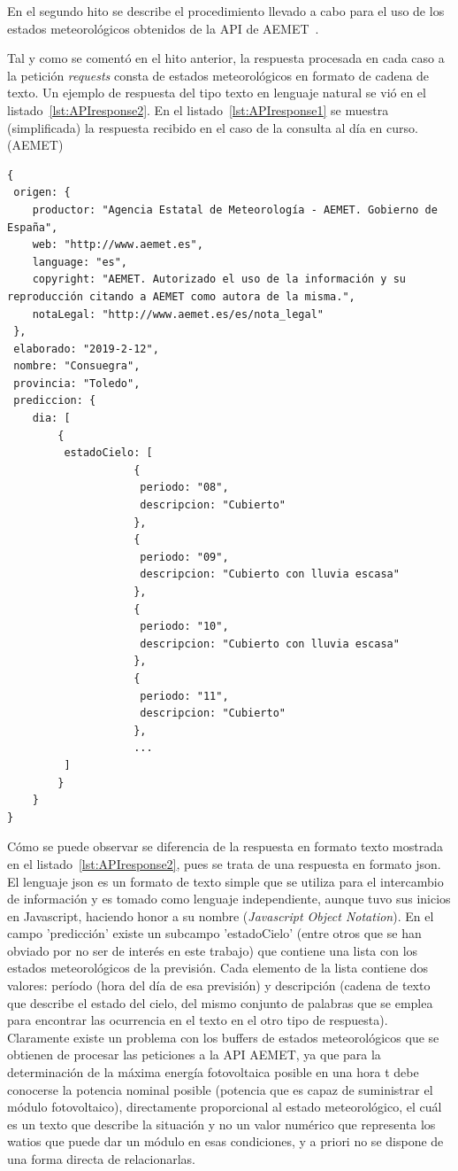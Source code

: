 En el segundo hito se describe el procedimiento llevado a cabo para el uso de los estados meteorológicos obtenidos de la API de AEMET~\cite{Aemet}.

Tal y como se comentó en el hito anterior, la respuesta procesada en cada caso a la petición \textit{requests} consta de estados meteorológicos en formato de cadena de texto. Un ejemplo de respuesta del tipo texto en lenguaje natural se vió en el listado~\ref{lst:APIresponse2}. En el listado~\ref{lst:APIresponse1} se muestra (simplificada) la respuesta recibido en el caso de la consulta al día en curso. (\textcopyright AEMET)

\begin{lstlisting}[numbers=none,float=ht,caption={Ejemplo de respuesta de la API - AEMET para el día en curso},label={lst:APIresponse1}]
{
 origen: {
	productor: "Agencia Estatal de Meteorología - AEMET. Gobierno de España",
	web: "http://www.aemet.es",
	language: "es",
	copyright: "AEMET. Autorizado el uso de la información y su reproducción citando a AEMET como autora de la misma.",
	notaLegal: "http://www.aemet.es/es/nota_legal"
 },
 elaborado: "2019-2-12",
 nombre: "Consuegra",
 provincia: "Toledo",
 prediccion: {
 	dia: [
		{
		 estadoCielo: [
					{
					 periodo: "08",
					 descripcion: "Cubierto"
					},
					{
					 periodo: "09",
					 descripcion: "Cubierto con lluvia escasa"
					},
					{
					 periodo: "10",
					 descripcion: "Cubierto con lluvia escasa"
					},
					{
					 periodo: "11",
					 descripcion: "Cubierto"
					},
					...
		 ]
		}
	}
}
\end{lstlisting}

Cómo se puede observar se diferencia de la respuesta en formato texto mostrada en el listado~\ref{lst:APIresponse2}, pues se trata de una respuesta en formato json. El lenguaje json es un formato de texto simple que se utiliza para el intercambio de información y es tomado como lenguaje independiente, aunque tuvo sus inicios en Javascript, haciendo honor a su nombre (\textit{Javascript Object Notation}). En el campo 'predicción' existe un subcampo 'estadoCielo' (entre otros que se han obviado por no ser de interés en este trabajo) que contiene una lista con los estados meteorológicos de la previsión. Cada elemento de la lista contiene dos valores: período (hora del día de esa previsión) y descripción (cadena de texto que describe el estado del cielo, del mismo conjunto de palabras que se emplea para encontrar las ocurrencia en el texto en el otro tipo de respuesta). Claramente existe un problema con los buffers de estados meteorológicos que se obtienen de procesar las peticiones a la API AEMET, ya que para la determinación de la máxima energía fotovoltaica posible en una hora t debe conocerse la potencia nominal posible (potencia que es capaz de suministrar el módulo fotovoltaico), directamente proporcional al estado meteorológico, el cuál es un texto que describe la situación y no un valor numérico que representa los watios que puede dar un módulo en esas condiciones, y a priori no se dispone de una forma directa de relacionarlas. \\

